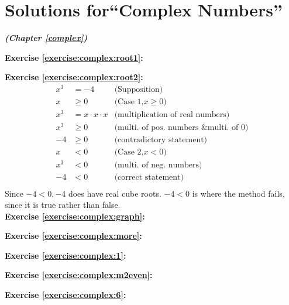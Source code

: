 \section{Solutions for``Complex Numbers''}
\noindent\textbf{\textit{ (Chapter \ref{complex})}}\bigskip

\noindent\textbf{Exercise \ref{exercise:complex:root1}:}

\noindent\textbf{Exercise \ref{exercise:complex:root2}:} %
\begin{align*}
x^{3} &= -4		&\text{(Supposition)}\\
x &\geq 0		&\text{(Case 1,} x \geq 0)\\
x^{3} &= x \cdot x \cdot x 		&\text{(multiplication of real numbers)}\\
x^{3} &\geq 0		&\text{(multi. of pos. numbers \& multi. of 0)}\\
-4 &\geq 0		&\text{(contradictory statement)}\\
x &< 0		&\text{(Case 2,} x < 0)\\
x^{3} &< 0		&\text{(multi. of neg. numbers)}\\
-4 &< 0		&\text{(correct statement)}\\
\end{align*}
Since $-4 < 0, -4$ does have real cube roots. $-4 < 0$ is where the method fails, since it is true rather than false.\\

\noindent\textbf{Exercise \ref{exercise:complex:graph}:}

\noindent\textbf{Exercise \ref{exercise:complex:more}:}

\noindent\textbf{Exercise \ref{exercise:complex:1}:}

\noindent\textbf{Exercise \ref{exercise:complex:m2even}:}

\noindent\textbf{Exercise \ref{exercise:complex:6}:}

